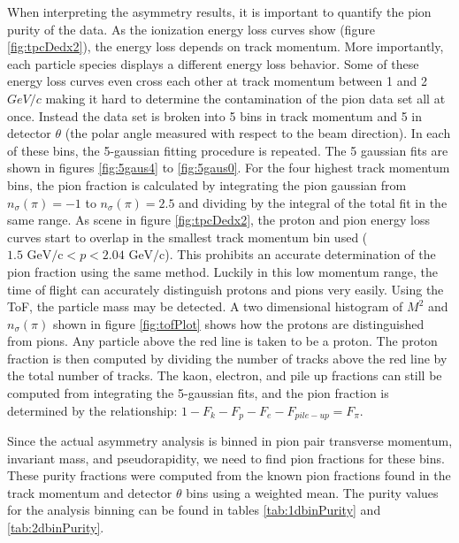 \documentclass[abstract = on,listof=totoc, bibliography=totoc]{scrreprt}
\begin{document}
When interpreting the asymmetry results, it is important to quantify the pion purity of the data. As the ionization energy loss curves show (figure \ref{fig:tpcDedx2}), the energy loss depends on track momentum. More importantly, each particle species displays a different energy loss behavior. Some of these energy loss curves even cross each other at track momentum between 1 and 2 $GeV/c$ making it hard to determine the contamination of the pion data set all at once. Instead the data set is broken into 5 bins in track momentum and 5 in detector $\theta$ (the polar angle measured with respect to the beam direction). In each of these bins, the 5-gaussian fitting procedure is repeated. The 5 gaussian fits are shown in figures \ref{fig:5gaus4} to \ref{fig:5gaus0}. For the four highest track momentum bins, the pion fraction is calculated by integrating the pion gaussian from $n_\sigma(\pi) = -1$ to $n_\sigma(\pi) = 2.5$ and dividing by the integral of the total fit in the same range. As scene in figure \ref{fig:tpcDedx2}, the proton and pion energy loss curves start to overlap in the smallest track momentum bin used ($1.5 \text{ GeV/c} < p < 2.04 \text{ GeV/c}$). This prohibits an accurate determination of the pion fraction using the same method. Luckily in this low momentum range, the time of flight can accurately distinguish protons and pions very easily. Using the ToF, the particle mass may be detected. A two dimensional histogram of $M^2$ and $n_\sigma(\pi)$ shown in figure \ref{fig:tofPlot} shows how the protons are distinguished from pions. Any particle above the red line is taken to be a proton. The proton fraction is then computed by dividing the number of tracks above the red line by the total number of tracks. The kaon, electron, and pile up fractions can still be computed from integrating the 5-gaussian fits, and the pion fraction is determined by the relationship: $1-F_k - F_p - F_e - F_{pile-up} = F_\pi$. 

Since the actual asymmetry analysis is binned in pion pair transverse momentum, invariant mass, and pseudorapidity, we need to find pion fractions for these bins. These purity fractions were computed from the known pion fractions found in the track momentum and detector $\theta$ bins using a weighted mean. The purity values for the analysis binning can be found in tables \ref{tab:1dbinPurity} and \ref{tab:2dbinPurity}.
\end{document}
